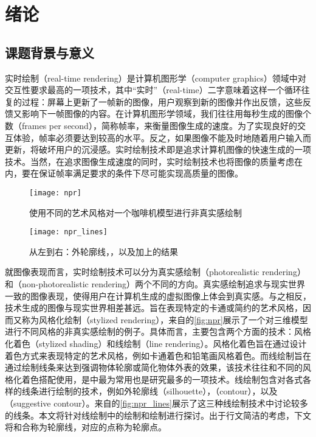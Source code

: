 \chapter{绪论}

\section{课题背景与意义}

实时绘制（real-time rendering）是计算机图形学（computer graphics）领域中对交互性要求最高的一项技术，其中“实时”（real-time）二字意味着这样一个循环往复的过程：屏幕上更新了一帧新的图像，用户观察到新的图像并作出反馈，这些反馈又影响下一帧图像的内容。在计算机图形学领域，我们往往用每秒生成的图像个数（frames per second），简称帧率，来衡量图像生成的速度。为了实现良好的交互体验，帧率必须要达到较高的水平。反之，如果图像不能及时地随着用户输入而更新，将破坏用户的沉浸感。实时绘制技术即是追求计算机图像的快速生成的一项技术。当然，在追求图像生成速度的同时，实时绘制技术也将图像的质量考虑在内，要在保证帧率满足要求的条件下尽可能实现高质量的图像。

\begin{figure}[!t]
    \centering
    \texttt{[image: npr]}
    \caption{\label{fig:npr}
    使用不同的艺术风格对一个咖啡机模型进行非真实感绘制}
\end{figure}

\begin{figure}[!b]
    \centering
    \texttt{[image: npr\_lines]}
    \caption{\label{fig:npr_lines}
    从左到右：外轮廓线，\con{}，以及\con{}加上\scon{}的结果}
\end{figure}

就图像表现而言，实时绘制技术可以分为真实感绘制（photorealistic rendering）和\npr{}（non-photorealistic rendering）两个不同的方向。真实感绘制追求与现实世界一致的图像表现，使得用户在计算机生成的虚拟图像上体会到真实感。与之相反，\npr{}技术生成的图像与现实世界相差甚远。\npr{}旨在表现特定的卡通或简约的艺术风格，因而又称为风格化绘制（stylized rendering），来自\cite{akenine2018real}的\autoref{fig:npr}展示了一个对三维模型进行不同风格的非真实感绘制的例子。具体而言，\npr{}主要包含两个方面的技术：风格化着色（stylized shading）和线绘制（line rendering）。风格化着色旨在通过设计着色方式来表现特定的艺术风格，例如卡通着色和铅笔画风格着色。而线绘制旨在通过绘制线条来达到强调物体轮廓或简化物体外表的效果，该技术往往和不同的风格化着色搭配使用，是\npr{}中最为常用也是研究最多的一项技术。线绘制包含对各式各样的线条进行绘制的技术，例如外轮廓线（silhouette），\con{}（contour），以及\scon{}（suggestive contour）。来自\cite{akenine2018real}的\autoref{fig:npr_lines}展示了这三种线绘制技术中讨论较多的线条。本文将针对线绘制中的\con{}绘制和\scon{}绘制进行探讨。出于行文简洁的考虑，下文将\con{}和\scon{}合称为轮廓线，对应的点称为轮廓点。

